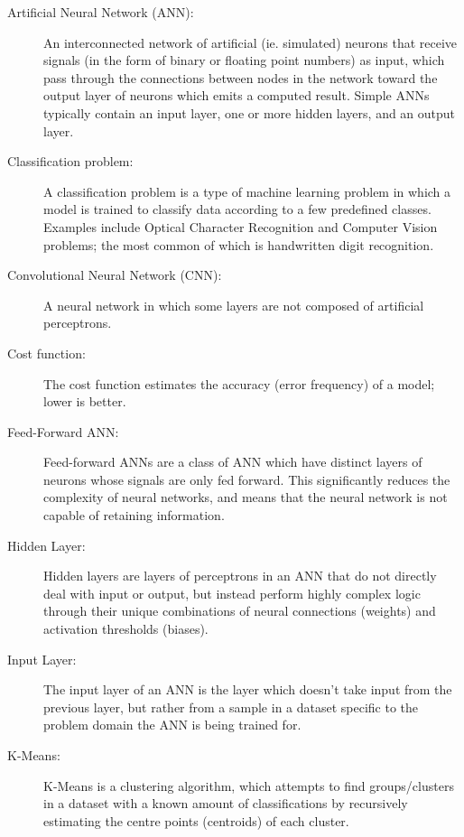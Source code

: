 \documentclass[]{report}
\begin{document}
\begin{description}
\item[Artificial Neural Network (ANN):] An interconnected network of artificial (ie. simulated) neurons that receive signals (in the form of binary or floating point numbers) as input, which pass through the connections between nodes in the network toward the output layer of neurons which emits a computed result. Simple ANNs typically contain an input layer, one or more hidden layers, and an output layer.

\item[Classification problem:] A classification problem is a type of machine learning problem in which a model is trained to classify data according to a few predefined classes. Examples include Optical Character Recognition and Computer Vision problems; the most common of which is handwritten digit recognition.

\item[Convolutional Neural Network (CNN):] A neural network in which some layers are not composed of artificial perceptrons.

\item[Cost function:] The cost function estimates the accuracy (error frequency) of a model; lower is better.

\item[Feed-Forward ANN:] Feed-forward ANNs are a class of ANN which have distinct layers of neurons whose signals are only fed forward. This significantly reduces the complexity of neural networks, and means that the neural network is not capable of retaining information.

\item[Hidden Layer:] Hidden layers are layers of perceptrons in an ANN that do not directly deal with input or output, but instead perform highly complex logic through their unique combinations of neural connections (weights) and activation thresholds (biases).

\item[Input Layer:] The input layer of an ANN is the layer which doesn't take input from the previous layer, but rather from a sample in a dataset specific to the problem domain the ANN is being trained for.

\item[K-Means:] K-Means is a clustering algorithm, which attempts to find groups/clusters in a dataset with a known amount of classifications by recursively estimating the centre points (centroids) of each cluster.


\end{description}
\end{document}
